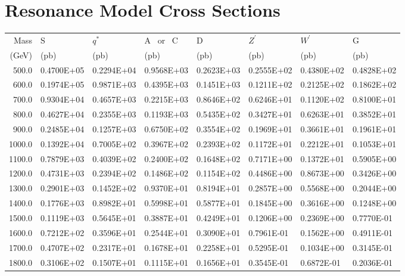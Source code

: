 \section{Resonance Model Cross Sections}
\label{appModel}

\begin{table}[tbh]
\begin{center}
{\scriptsize
\begin{tabular}{|r|l|l|l|l|l|l|l|}\hline 
   Mass   &   S & $q^*$  & A \ or \ C &       D  & $Z^{\prime}$ &  $W^{\prime}$ &   G \\
   (GeV)  &  (pb) & (pb)    &   (pb)   &     (pb)   &     (pb)   &     (pb)      &  (pb) \\ \hline
   500.0 & 0.4700E+05 & 0.2294E+04 & 0.9568E+03 & 0.2623E+03 & 0.2555E+02 & 0.4380E+02 & 0.4828E+02 \\
   600.0 & 0.1974E+05 & 0.9871E+03 & 0.4395E+03 & 0.1451E+03 & 0.1211E+02 & 0.2125E+02 & 0.1862E+02 \\
   700.0 & 0.9304E+04 & 0.4657E+03 & 0.2215E+03 & 0.8646E+02 & 0.6246E+01 & 0.1120E+02 & 0.8100E+01 \\
   800.0 & 0.4627E+04 & 0.2355E+03 & 0.1193E+03 & 0.5435E+02 & 0.3427E+01 & 0.6263E+01 & 0.3852E+01 \\
   900.0 & 0.2485E+04 & 0.1257E+03 & 0.6750E+02 & 0.3554E+02 & 0.1969E+01 & 0.3661E+01 & 0.1961E+01 \\
  1000.0 & 0.1392E+04 & 0.7005E+02 & 0.3967E+02 & 0.2393E+02 & 0.1172E+01 & 0.2212E+01 & 0.1053E+01 \\
  1100.0 & 0.7879E+03 & 0.4039E+02 & 0.2400E+02 & 0.1648E+02 & 0.7171E+00 & 0.1372E+01 & 0.5905E+00 \\
  1200.0 & 0.4731E+03 & 0.2394E+02 & 0.1486E+02 & 0.1154E+02 & 0.4486E+00 & 0.8673E+00 & 0.3426E+00 \\
  1300.0 & 0.2901E+03 & 0.1452E+02 & 0.9370E+01 & 0.8194E+01 & 0.2857E+00 & 0.5568E+00 & 0.2044E+00 \\
  1400.0 & 0.1776E+03 & 0.8982E+01 & 0.5998E+01 & 0.5877E+01 & 0.1845E+00 & 0.3616E+00 & 0.1248E+00 \\
  1500.0 & 0.1119E+03 & 0.5645E+01 & 0.3887E+01 & 0.4249E+01 & 0.1206E+00 & 0.2369E+00 & 0.7770E-01 \\
  1600.0 & 0.7212E+02 & 0.3596E+01 & 0.2544E+01 & 0.3090E+01 & 0.7961E-01 & 0.1562E+00 & 0.4911E-01 \\
  1700.0 & 0.4707E+02 & 0.2317E+01 & 0.1678E+01 & 0.2258E+01 & 0.5295E-01 & 0.1034E+00 & 0.3145E-01 \\
  1800.0 & 0.3106E+02 & 0.1507E+01 & 0.1115E+01 & 0.1656E+01 & 0.3545E-01 & 0.6872E-01 & 0.2036E-01 \\

\end{tabular}}
\end{center}
\end{table}
